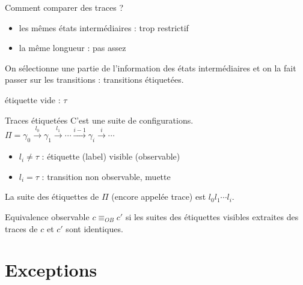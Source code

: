 \documentclass[10pt,a4paper]{article}
\begin{document}
Comment comparer des traces ? \begin{itemize}
\item les mêmes états intermédiaires : trop restrictif
\item la même longueur : pas assez
\end{itemize}
On sélectionne une partie de l'information des états intermédiaires et on la fait passer sur les transitions : transitions étiquetées.

étiquette vide : $\tau$

\begin{definition}{Traces étiquetées}
C'est une suite de configurations.\\
$\Pi = \gamma_0 \xrightarrow{l_0} \gamma_1 \xrightarrow{l_1} \cdots \xrightarrow{i-1} \gamma_i \xrightarrow{i} \cdots$\medskip
\begin{itemize}
\item $l_i \not = \tau $ : étiquette (label) visible (observable)
\item $l_i = \tau$ : transition non observable, muette
\end{itemize}
La suite des étiquettes de $\Pi$ (encore appelée trace) est $l_0l_1\cdots l_i$.\\
\end{definition}

\begin{definition}{Equivalence observable}
$c \equiv_{OB} c'$ si les suites des étiquettes visibles extraites des traces de $c$ et $c'$ sont identiques.\\
\end{definition}

\section{Exceptions}
\end{document}
